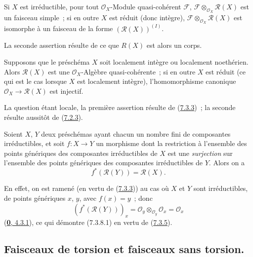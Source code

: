 \begin{corollary}[7.3.6]
\label{I.7.3.6-fr}
Si $X$ est irréductible, pour tout $\mathscr{O}_X$-Module quasi-cohérent
$\mathscr{F}$, $\mathscr{F}\otimes_{\mathscr{O}_X}\mathscr{R}(X)$ est un
faisceau simple~; si en outre $X$ est réduit (donc intègre),
$\mathscr{F}\otimes_{\mathscr{O}_X}\mathscr{R}(X)$ est isomorphe à un
faisceau de la forme $(\mathscr{R}(X))^{(I)}$.
\end{corollary}

La seconde assertion résulte de ce que $R(X)$ est alors un corps.

\begin{proposition}[7.3.7]
\label{I.7.3.7-fr}
Supposons que le préschéma $X$ soit localement intègre ou localement
noethérien. Alors $\mathscr{R}(X)$ est une $\mathscr{O}_X$-Algèbre
quasi-cohérente~; si en outre $X$ est réduit (ce qui est le cas lorsque $X$
est localement intègre), l'homomorphisme canonique
$\mathscr{O}_X\to\mathscr{R}(X)$ est injectif.
\end{proposition}

La question étant locale, la première assertion résulte de
(\hyperref[I.7.3.3-fr]{7.3.3})~; la seconde résulte aussitôt de
(\hyperref[I.7.2.3-fr]{7.2.3}).

\begin{env}[7.3.8]
\label{I.7.3.8-fr}
Soient $X$, $Y$ deux préschémas ayant chacun un nombre fini de composantes
irréductibles, et soit $f:X\to Y$ un morphisme dont la restriction à
l'ensemble des points génériques des composantes irréductibles de $X$ est une
\emph{surjection} sur l'ensemble des points génériques des composantes irréductibles
de $Y$. Alors on a
\[
  f^*(\mathscr{R}(Y))=\mathscr{R}(X).
  \tag{7.3.8.1}\label{I.7.3.8.1-fr}
\]
\end{env}

En effet, on est ramené (en vertu de
(\hyperref[I.7.3.3-fr]{7.3.3})) au cas où $X$ et $Y$ sont irréductibles, de
points génériques $x$, $y$, avec $f(x)=y$~; donc
\[
  (f^*(\mathscr{R}(Y)))_x
  =\mathscr{O}_y\otimes_{\mathscr{O}_y}\mathscr{O}_x
  =\mathscr{O}_x
\]
(\hyperref[0.4.3.1-fr]{\textbf{0}, 4.3.1}), ce qui démontre (7.3.8.1) en vertu de
(\hyperref[I.7.3.5-fr]{7.3.5}).

\subsection{Faisceaux de torsion et faisceaux sans torsion.}
\label{subsection:I.7.4-fr}

